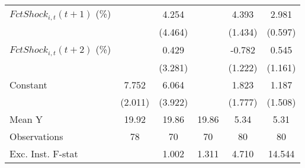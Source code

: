 {\begin{tabular}{l*{5}{c}}
\addlinespace
$ FctShock_{i,t}(t+1)$ (\%)&                     &       4.254         &                     &       4.393\sym{**} &       2.981\sym{***}\\
                    &                     &     (4.464)         &                     &     (1.434)         &     (0.597)         \\
\addlinespace
$ FctShock_{i,t}(t+2)$ (\%)&                     &       0.429         &                     &      -0.782         &       0.545         \\
                    &                     &     (3.281)         &                     &     (1.222)         &     (1.161)         \\
\addlinespace
Constant            &       7.752\sym{***}&       6.064         &                     &       1.823         &       1.187         \\
                    &     (2.011)         &     (3.922)         &                     &     (1.777)         &     (1.508)         \\
\midrule
Mean Y              &       19.92         &       19.86         &       19.86         &        5.34         &        5.31         \\
Observations        &          78         &          70         &          70         &          80         &          80         \\
Exc. Inst. F-stat   &                     &       1.002         &       1.311         &       4.710         &      14.544         \\
\bottomrule
\end{tabular}
}
